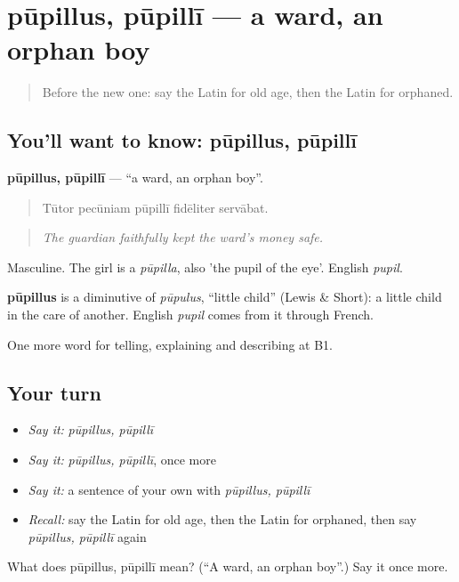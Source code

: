 \section[pūpillus, pūpillī]{pūpillus, pūpillī — a ward, an orphan boy}

\label{lesson:LA-C326-pupillus}



\begin{quote}
Before the new one: say the Latin for old age, then the Latin for orphaned.
\end{quote}

\subsection*{You'll want to know: pūpillus, pūpillī}
\textbf{pūpillus, pūpillī} — \textquotedblleft{}a ward, an orphan boy\textquotedblright{}.

\begin{quote}
Tūtor pecūniam pūpillī fidēliter servābat.
\end{quote}

\begin{quote}
\emph{The guardian faithfully kept the ward's money safe.}
\end{quote}

Masculine. The girl is a \emph{pūpilla}, also 'the pupil of the eye'. English \emph{pupil}.

\begin{cousinweb}
\textbf{pūpillus} is a diminutive of \emph{pūpulus}, \textquotedblleft{}little child\textquotedblright{} (Lewis \& Short): a little child in the care of another. English \emph{pupil} comes from it through French.
\end{cousinweb}

\begin{grammarlens}[title={What you've built}]
One more word for telling, explaining and describing at B1.
\end{grammarlens}

\subsection*{Your turn}
\begin{itemize}
\raggedright
  \item \emph{Say it:} \emph{pūpillus, pūpillī}
  \item \emph{Say it:} \emph{pūpillus, pūpillī}, once more
  \item \emph{Say it:} a sentence of your own with \emph{pūpillus, pūpillī}
  \item \emph{Recall:} say the Latin for old age, then the Latin for orphaned, then say \emph{pūpillus, pūpillī} again
\end{itemize}

\begin{tcolorbox}[breakable,colback=teal!4,colframe=teal!35!black,title={Before you move on}]
What does pūpillus, pūpillī mean? (\textquotedblleft{}A ward, an orphan boy\textquotedblright{}.) Say it once more.
\end{tcolorbox}
